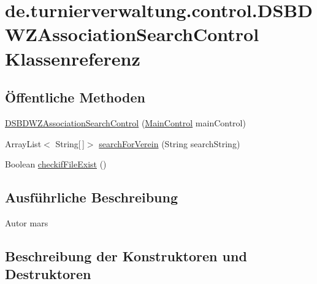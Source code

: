 \hypertarget{classde_1_1turnierverwaltung_1_1control_1_1_d_s_b_d_w_z_association_search_control}{}\section{de.\+turnierverwaltung.\+control.\+D\+S\+B\+D\+W\+Z\+Association\+Search\+Control Klassenreferenz}
\label{classde_1_1turnierverwaltung_1_1control_1_1_d_s_b_d_w_z_association_search_control}
\subsection*{Öffentliche Methoden}
\begin{DoxyCompactItemize}
\item 
\hyperlink{classde_1_1turnierverwaltung_1_1control_1_1_d_s_b_d_w_z_association_search_control_ae5683c48a0f5f21e00af47ef387a78fd}{D\+S\+B\+D\+W\+Z\+Association\+Search\+Control} (\hyperlink{classde_1_1turnierverwaltung_1_1control_1_1_main_control}{Main\+Control} main\+Control)
\item 
Array\+List$<$ String\mbox{[}$\,$\mbox{]}$>$ \hyperlink{classde_1_1turnierverwaltung_1_1control_1_1_d_s_b_d_w_z_association_search_control_a75e86cd4c07c59f6212e7743869a312d}{search\+For\+Verein} (String search\+String)
\item 
Boolean \hyperlink{classde_1_1turnierverwaltung_1_1control_1_1_d_s_b_d_w_z_association_search_control_afed7abc650d96e72af1c8ec9776565a4}{checkif\+File\+Exist} ()
\end{DoxyCompactItemize}


\subsection{Ausführliche Beschreibung}
\begin{DoxyAuthor}{Autor}
mars 
\end{DoxyAuthor}


\subsection{Beschreibung der Konstruktoren und Destruktoren}
